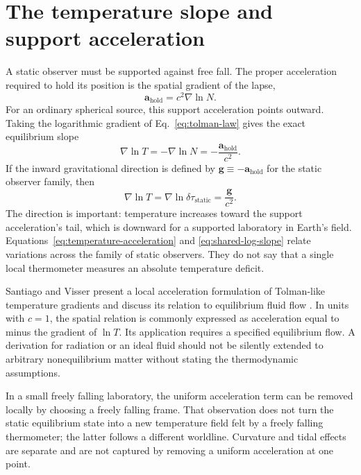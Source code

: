 \documentclass[12pt]{article}
\begin{document}
\section{The temperature slope and support acceleration}

A static observer must be supported against free fall. The proper acceleration required to hold its position is the spatial gradient of the lapse,
\begin{equation}
  \mathbf{a}_{\mathrm{hold}}
  =c^2\nabla\ln N.
  \label{eq:holding-acceleration}
\end{equation}
For an ordinary spherical source, this support acceleration points outward. Taking the logarithmic gradient of Eq.~\eqref{eq:tolman-law} gives the exact equilibrium slope
\begin{equation}
  \boxed{\nabla\ln T
  =-\nabla\ln N
  =-\frac{\mathbf{a}_{\mathrm{hold}}}{c^2}.}
  \label{eq:temperature-acceleration}
\end{equation}
If the inward gravitational direction is defined by $\mathbf{g}\equiv-\mathbf{a}_{\mathrm{hold}}$ for the static observer family, then
\begin{equation}
  \nabla\ln T
  =\nabla\ln\delta\tau_{\mathrm{static}}
  =\frac{\mathbf{g}}{c^2}.
  \label{eq:shared-log-slope}
\end{equation}
The direction is important: temperature increases toward the support acceleration's tail, which is downward for a supported laboratory in Earth's field. Equations~\eqref{eq:temperature-acceleration} and \eqref{eq:shared-log-slope} relate variations across the family of static observers. They do not say that a single local thermometer measures an absolute temperature deficit.

Santiago and Visser present a local acceleration formulation of Tolman-like temperature gradients and discuss its relation to equilibrium fluid flow \cite{SantiagoVisser2018}. In units with $c=1$, the spatial relation is commonly expressed as acceleration equal to minus the gradient of $\ln T$. Its application requires a specified equilibrium flow. A derivation for radiation or an ideal fluid should not be silently extended to arbitrary nonequilibrium matter without stating the thermodynamic assumptions.

In a small freely falling laboratory, the uniform acceleration term can be removed locally by choosing a freely falling frame. That observation does not turn the static equilibrium state into a new temperature field felt by a freely falling thermometer; the latter follows a different worldline. Curvature and tidal effects are separate and are not captured by removing a uniform acceleration at one point.
\end{document}
